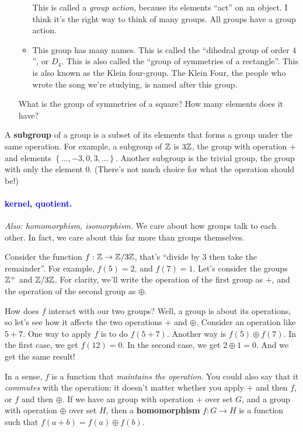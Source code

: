 \documentclass[11pt,paper=letter]{scrartcl}
\renewcommand\wp[1]{\paragraph{\textcolor{Blue}{#1.}} \hspace{-1em}}
\newcommand\wl[1]{\label{w:#1}}
\newcommand\oww[1]{\textit{Also: #1.}}
\begin{document}
\begin{itemize}
\begin{itemize}
    \begin{remboxed}
      This is called a \textit{group action}, because its elements ``act'' on an object. I think it's the right way to think of many groups. All groups have a group action.
    \end{remboxed}
    \item This group has many names. This is called the ``dihedral group of order $4$'', or $D_4$. This is also called the ``group of symmetries of a rectangle''. This is also known as the Klein four-group. The Klein Four, the people who wrote the song we're studying, is named after this group.
  \end{itemize}
  \begin{exrboxed}
    What is the group of symmetries of a square? How many elements does it have?
  \end{exrboxed}
\end{itemize}

A \textbf{subgroup} of a group is a subset of its elements that forms a group under the same operation. For example, a subgroup of $\mathbb Z$ is $3\mathbb Z$, the group with operation $+$ and elements $ \left\{ \ldots,-3, 0, 3, \ldots \right\} $. Another subgroup is the trivial group, the group with only the element $0$. (There's not much choice for what the operation should be!)

\wp{kernel, quotient}
\wl{kernel}
\wl{quotient}
\oww{homomorphism, isomorphism}
We care about how groups talk to each other. In fact, we care about this far more than groups themselves.

Consider the function $f : \mathbb Z \to \mathbb Z/3\mathbb Z$, that's ``divide by $3$ then take the remainder''. For example, $f(5) = 2$, and $f(7) = 1$. Let's consider the groups $\mathbb Z^+$ and $\mathbb Z/3\mathbb Z$. For clarity, we'll write the operation of the first group as $+$, and the operation of the second group as $\oplus$.

How does $f$ interact with our two groups? Well, a group is about its operations, so let's see how it affects the two operations $+$ and $\oplus$. Consider an operation like $5 + 7$. One way to apply $f$ is to do $f(5 + 7)$. Another way is $f(5) \oplus f(7)$. In the first case, we get $f(12) = 0$. In the second case, we get $2 \oplus 1 = 0$. And we get the same result!

In a sense, $f$ is a function that \textit{maintains the operation}. You could also say that it \textit{commutes} with the operation: it doesn't matter whether you apply $+$ and then $f$, or $f$ and then $\oplus$. If we have an group with operation $+$ over set $G$, and a group with operation $\oplus$ over set $H$, then a \textbf{homomorphism} $f : G \to H$ is a function such that $f(a + b) = f(a) \oplus f(b)$.
\end{document}
